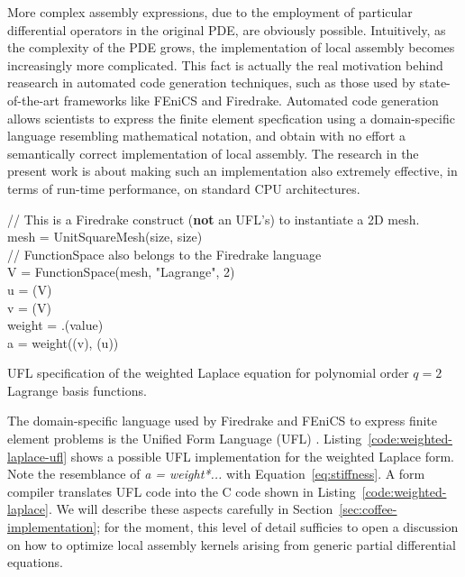 More complex assembly expressions, due to the employment of particular differential operators in the original PDE, are obviously possible. Intuitively, as the complexity of the PDE grows, the implementation of local assembly becomes increasingly more complicated. This fact is actually the real motivation behind reasearch in automated code generation techniques, such as those used by state-of-the-art frameworks like FEniCS and Firedrake. Automated code generation allows scientists to express the finite element specfication using a domain-specific language resembling mathematical notation, and obtain with no effort a semantically correct implementation of local assembly. The research in the present work is about making such an implementation also extremely effective, in terms of run-time performance, on standard CPU architectures. 

\begin{algorithm}[t]
\scriptsize
{}

// This is a Firedrake construct (\textbf{not} an UFL's) to instantiate a 2D mesh.\\
mesh = UnitSquareMesh(size, size)\\
// FunctionSpace also belongs to the Firedrake language \\
V = FunctionSpace(mesh, "Lagrange", 2)\\
u = (V)\\
v = (V)\\
weight = .(value)\\
a = weight\KwSty{*}((v), (u))
\caption{UFL specification of the weighted Laplace equation for polynomial order $q=2$ Lagrange basis functions.}
\label{code:weighted-laplace-ufl}
\end{algorithm}

The domain-specific language used by Firedrake and FEniCS to express finite element problems is the Unified Form Language (UFL) \citep{ufl}. Listing~\ref{code:weighted-laplace-ufl} shows a possible UFL implementation for the weighted Laplace form. Note the resemblance of \emph{a = weight*...} with Equation~\ref{eq:stiffness}. A form compiler translates UFL code into the C code shown in Listing~\ref{code:weighted-laplace}. We will describe these aspects carefully in Section~\ref{sec:coffee-implementation}; for the moment, this level of detail sufficies to open a discussion on how to optimize local assembly kernels arising from generic partial differential equations.

